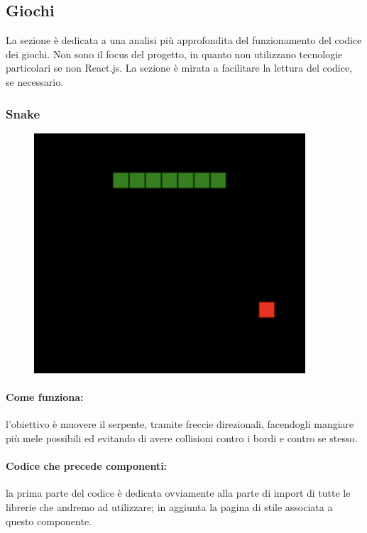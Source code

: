 \documentclass{article}
\begin{document}
\subsection{Giochi}
La sezione è dedicata a una analisi più approfondita del funzionamento del codice dei giochi.
Non sono il focus del progetto, in quanto non utilizzano tecnologie particolari se non React.js. La sezione è mirata a facilitare la lettura del codice, se necessario.


\subsubsection{Snake}
\begin{figure}[H]
    \centering
    \includegraphics[width=0.9\textwidth]{../frontend/public/images/snake.png}
\end{figure}

\paragraph{Come funziona:}
l'obiettivo è muovere il serpente, tramite freccie direzionali, facendogli mangiare più mele possibili ed evitando di avere collisioni contro i bordi e contro se stesso.


\paragraph{Codice che precede componenti:} 
la prima parte del codice è dedicata ovviamente alla parte di import di tutte le librerie che andremo ad utilizzare; in aggiunta la pagina di stile associata a questo componente.
\end{document}
